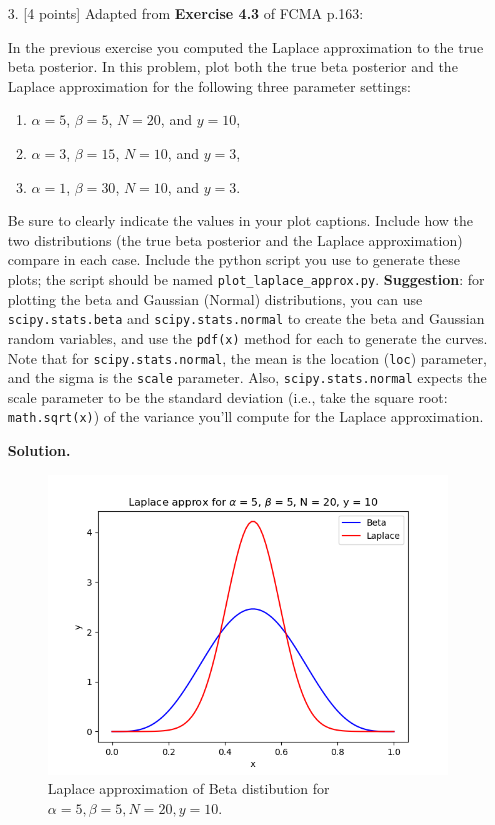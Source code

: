 \documentclass[10pt]{article}
\begin{document}
\begin{itemize}
\item[3.]  [4 points]
Adapted from {\bf Exercise 4.3} of FCMA p.163:

In the previous exercise you computed the Laplace approximation to the true beta posterior.  In this problem, plot both the true beta posterior and the Laplace approximation for the following three parameter settings:
\begin{enumerate}
\item $\alpha = 5$, $\beta = 5$, $N = 20$, and $y = 10$,
\item $\alpha = 3$, $\beta = 15$, $N = 10$, and $y = 3$,
\item $\alpha = 1$, $\beta = 30$, $N = 10$, and $y = 3$.
\end{enumerate}
Be sure to clearly indicate the values in your plot captions.  Include how the two distributions (the true beta posterior and the Laplace approximation) compare in each case.  Include the python script you use to generate these plots; the script should be named {\tt plot\_laplace\_approx.py}.  {\bf Suggestion}: for plotting the beta and Gaussian (Normal) distributions, you can use {\tt scipy.stats.beta} and {\tt scipy.stats.normal} to create the beta and Gaussian random variables, and use the {\tt pdf(x)} method for each to generate the curves.  Note that for {\tt scipy.stats.normal}, the mean is the location ({\tt loc}) parameter, and the sigma is the {\tt scale} parameter.  Also, {\tt scipy.stats.normal} expects the scale parameter to be the standard deviation (i.e., take the square root: {\tt math.sqrt(x)}) of the variance you'll compute for the Laplace approximation.


{\bf Solution.}

\begin{figure}[H]
\centering
  \includegraphics[width=\linewidth]{laplace1.png}
 \caption{Laplace approximation of Beta distibution for $\alpha = 5, \beta = 5, N = 20, y = 10$.}
\label{label}
\end{figure}


\end{itemize}
\end{document}
